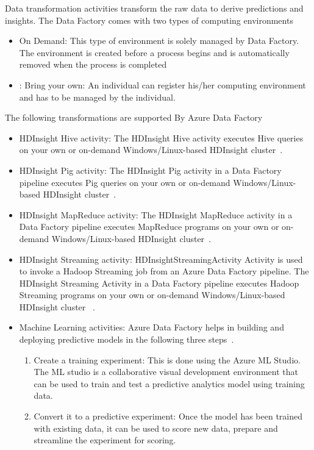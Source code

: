 \documentclass[9pt,twocolumn,twoside]{styles/osajnl}
\begin{document}
Data transformation activities transform the raw data to derive predictions and insights. 
The Data Factory comes with two types of computing environments
\begin{itemize}
    \item On Demand: This type of environment is solely managed by Data Factory. The environment is created before a process begins and is automatically removed when the process is completed
    \item: Bring your own: An individual can register his/her computing environment and has to be managed by the individual.
\end{itemize}

The following transformations are supported By Azure Data Factory~\cite{www-microsoft-azure-transform}
\begin{itemize}
    \item HDInsight Hive activity: The HDInsight Hive activity executes Hive queries on your own or on-demand Windows/Linux-based HDInsight cluster~\cite{www-microsoft-azure-hive}.
    \item HDInsight Pig activity: The HDInsight Pig activity in a Data Factory pipeline executes Pig queries on your own or on-demand Windows/Linux-based HDInsight cluster~\cite{www-microsoft-azure-pig}.
    \item HDInsight MapReduce activity: The HDInsight MapReduce activity in a Data Factory pipeline executes MapReduce programs on your own or on-demand Windows/Linux-based HDInsight cluster~\cite{www-microsoft-azure-map}.
    \item HDInsight Streaming activity: HDInsightStreamingActivity Activity is used to invoke a Hadoop Streaming job from an Azure Data Factory pipeline. The HDInsight Streaming Activity in a Data Factory pipeline executes Hadoop Streaming programs on your own or on-demand Windows/Linux-based HDInsight cluster ~\cite{www-microsoft-azure-hsa}.
    \item Machine Learning activities: Azure Data Factory helps in building and deploying predictive models in the following three steps~\cite{www-microsoft-azure-ml}.
    \begin{enumerate}
        \item Create a training experiment: This is done using the Azure ML Studio. The ML studio is a collaborative visual development environment that can be used to train and test a predictive analytics model using training data.
        \item Convert it to a predictive experiment: Once the model has been trained with existing data, it can be used to score new data, prepare and streamline the experiment for scoring.

\end{enumerate}
\end{itemize}
\end{document}
